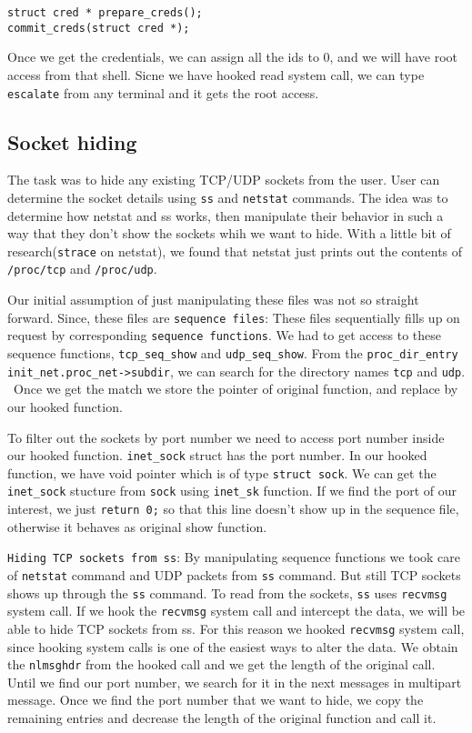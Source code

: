 \documentclass[10pt, letterpaper]{scrartcl}
\begin{document}
\begin{verbatim}
struct cred * prepare_creds();
commit_creds(struct cred *);
\end{verbatim}

Once we get the credentials, we can assign all the ids to 0, and we will have root access from that shell. 
Sicne we have hooked read system call, 
we can type \texttt{escalate} from any terminal and it gets the root access. 

\subsection{Socket hiding}
The task was to hide any existing TCP/UDP sockets from the user. 
User can determine the socket details using \texttt{ss} and \texttt{netstat} commands.
The idea was to determine how netstat and ss works, 
then manipulate their behavior in such a way that they don't show the sockets whih we want to hide. 
With a little bit of research(\texttt{strace} on netstat), 
we found that netstat just prints out the contents of \texttt{/proc/tcp} and \texttt{/proc/udp}.

Our initial assumption of just manipulating these files was not so straight forward. 
Since, these files are \texttt{sequence files}: 
These files sequentially fills up on request by corresponding \texttt{sequence functions}. 
We had to get access to these sequence functions, \texttt{tcp\_seq\_show} and \texttt{udp\_seq\_show}. 
From the \texttt{proc\_dir\_entry} \texttt{init\_net.proc\_net->subdir}, 
we can search for the directory names \texttt{tcp} and \texttt{udp}. \
Once we get the match we store the pointer of original function, and replace by our hooked function. 

To filter out the sockets by port number we need to access port number inside our hooked function. 
\texttt{inet\_sock} struct has the port number. 
In our hooked function, we have void pointer which is of type \texttt{struct sock}. 
We can get the \texttt{inet\_sock} stucture from \texttt{sock} using \texttt{inet\_sk} function. 
If we find the port of our interest, we just \texttt{return 0;} so that this line doesn't show up in the 
sequence file, otherwise it behaves as original show function. 

\texttt{Hiding TCP sockets from ss}: By manipulating sequence functions we took care of \texttt{netstat} 
command and UDP packets from \texttt{ss} command. But still TCP sockets shows up through the \texttt{ss} command.
To read from the sockets, \texttt{ss} uses \texttt{recvmsg} system call. 
If we hook the \texttt{recvmsg} system call and intercept the data, we will be able to hide TCP sockets from ss. 
For this reason we hooked \texttt{recvmsg} system call, 
since hooking system calls is one of the easiest ways to alter the data.
We obtain the \texttt{nlmsghdr} from the hooked call and we get the length of the original call.
Until we find our port number, we search for it in the next messages in multipart message. 
Once we find the port number that we want to hide, 
we copy the remaining entries and decrease the length of the original function and call it.
\end{document}
